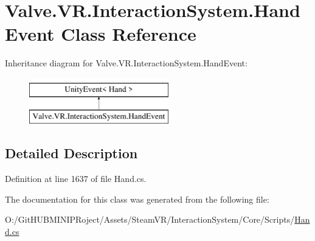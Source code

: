 \hypertarget{class_valve_1_1_v_r_1_1_interaction_system_1_1_hand_event}{}\section{Valve.\+V\+R.\+Interaction\+System.\+Hand\+Event Class Reference}
\label{class_valve_1_1_v_r_1_1_interaction_system_1_1_hand_event}
Inheritance diagram for Valve.\+V\+R.\+Interaction\+System.\+Hand\+Event\+:\begin{figure}[H]
\begin{center}
\leavevmode
\includegraphics[height=2.000000cm]{class_valve_1_1_v_r_1_1_interaction_system_1_1_hand_event}
\end{center}
\end{figure}


\subsection{Detailed Description}


Definition at line 1637 of file Hand.\+cs.



The documentation for this class was generated from the following file\+:\begin{DoxyCompactItemize}
\item 
O\+:/\+Git\+H\+U\+B\+M\+I\+N\+I\+P\+Roject/\+Assets/\+Steam\+V\+R/\+Interaction\+System/\+Core/\+Scripts/\mbox{\hyperlink{_steam_v_r_2_interaction_system_2_core_2_scripts_2_hand_8cs}{Hand.\+cs}}\end{DoxyCompactItemize}
